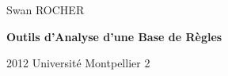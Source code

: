 
{\setlength{\parindent}{0cm}
Swan ROCHER
}
\vfill
{\centering \Huge \bfseries Outils d'Analyse d'une Base de Règles\par}
\vfill
2012 \hfill Université Montpellier 2
\newpage
 
\setcounter{tocdepth}{1}
\tableofcontents
\thispagestyle{empty}
\newpage

